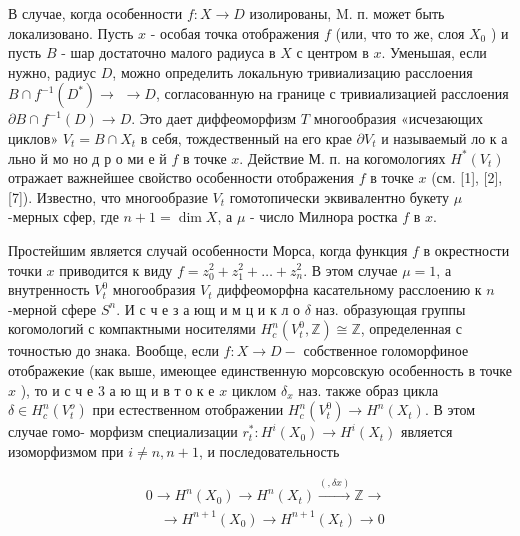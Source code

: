 \documentclass[10pt]{article}
\begin{document}
В случае, когда особенности $f: X \rightarrow D$ изолированы, M. п. может быть локализовано. Пусть $x$ - особая точка отображения $f$ (или, что то же, слоя $X_{0}$ ) и пусть $B$ - шар достаточно малого радиуса в $X$ с центром в $x$. Уменьшая, если нужно, радиус $D$, можно определить локальную тривиализацию расслоения $B \cap f^{-1}\left(D^{*}\right) \rightarrow$ $\rightarrow D$, согласованную на границе с тривиализацией расслоения $\partial B \cap f^{-1}(D) \rightarrow D$. Это дает диффеоморфизм $T$ многообразия «исчезающих циклов» $V_{t}=B \cap X_{t}$ в себя, тождественный на его крае $\partial V_{t}$ и называемый ло к а льно й мо но д р о ми е й $f$ в точке $x$. Действие М. п. на когомологиях $H^{*}\left(V_{t}\right)$ отражает важнейшее свойство особенности отображения $f$ в точке $x$ (см. [1], [2], [7]). Известно, что многообразие $V_{t}$ гомотопически эквивалентно букету $\mu$-мерных сфер, где $n+1=\operatorname{dim} X$, а $\mu$ - число Милнора ростка $f$ в $x$.



Простейшим является случай особенности Морса, когда функция $f$ в окрестности точки $x$ приводится к виду $f=z_{0}^{2}+z_{1}^{2}+\ldots+z_{n}^{2}$. В этом случае $\mu=1$, а внутренность $V_{t}^{0}$ многообразия $V_{t}$ диффеоморфна касательному расслоению к $n$-мерной сфере $S^{n}$. И с ч е з а ющ и м ц и к л о $\delta$ наз. образующая группы когомологий с компактными носителями $H_{c}^{n}\left(V_{t}^{0}, \mathbb{Z}\right) \cong \mathbb{Z}$, определенная с точностью до знака. Вообще, если $f: X \rightarrow D-$ собственное голоморфиное отображекие (как выше, имеющее единственную морсовскую особенность в точке $x$ ), то и с ч е 3 а ю щ и в т о к е $x$ циклом $\delta_{x}$ наз. также образ цикла $\delta \in H_{c}^{n}\left(V_{t}^{o}\right)$ при естественном отображении $H_{c}^{n}\left(V_{t}^{0}\right) \rightarrow H^{n}\left(X_{t}\right)$. В этом случае гомо- морфизм специализации $r_{t}^{*}: H^{i}\left(X_{0}\right) \rightarrow H^{i}\left(X_{t}\right)$ является изоморфизмом при $i \neq n, n+1$, и последовательность



\[

\begin{aligned}

& 0 \longrightarrow H^{n}\left(X_{0}\right) \longrightarrow H^{n}\left(X_{t}\right) \stackrel{(, \delta x)}{\longrightarrow} \mathbb{Z} \longrightarrow \\

& \quad \rightarrow H^{n+1}\left(X_{0}\right) \longrightarrow H^{n+1}\left(X_{t}\right) \longrightarrow 0

\end{aligned}

\]
\end{document}
